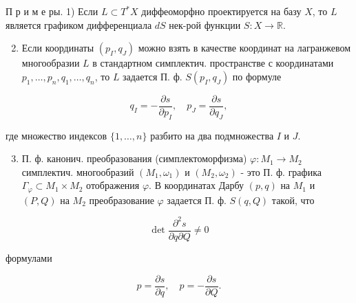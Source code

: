 \documentclass[10pt]{article}
\begin{document}
П р и м е ры. 1) Если $L \subset T^{*} X$ диффеоморфно проектируется на базу $X$, то $L$ является графиком дифференциала $d S$ нек-рой функции $S: X \rightarrow \mathbb{R}$.



\begin{enumerate}

  \setcounter{enumi}{1}

  \item Если координаты $\left(p_{I}, q_{J}\right)$ можно взять в качестве координат на лагранжевом многообразии $L$ в стандартном симплектич. пространстве с координатами $p_{1}, \ldots, p_{n}, q_{1}, \ldots, q_{n}$, то $L$ задается П. ф. $S\left(p_{I}, q_{J}\right)$ по формуле

\end{enumerate}



\[

q_{I}=-\frac{\partial s}{\partial p_{I}}, \quad p_{J}=\frac{\partial s}{\partial q_{J}},

\]



где множество индексов $\{1, \ldots, n\}$ разбито на два подмножества $I$ и $J$.



\begin{enumerate}

  \setcounter{enumi}{2}

  \item П. ф. канонич. преобразования (симплектоморфизма) $\varphi: M_{1} \rightarrow M_{2}$ симплектич. многообразий $\left(M_{1}, \omega_{1}\right)$ и $\left(M_{2}, \omega_{2}\right)$ - это П. ф. графика $\Gamma_{\varphi} \subset M_{1} \times M_{2}$ отображения $\varphi$. В координатах Дарбу $(p, q)$ на $M_{1}$ и $(P, Q)$ на $M_{2}$ преобразование $\varphi$ задается П. ф. $S(q, Q)$ такой, что

\end{enumerate}



\[

\operatorname{det} \frac{\partial^{2} s}{\partial q \partial Q} \neq 0

\]



формулами



\[

p=\frac{\partial s}{\partial q}, \quad p=-\frac{\partial s}{\partial Q} .

\]
\end{document}
